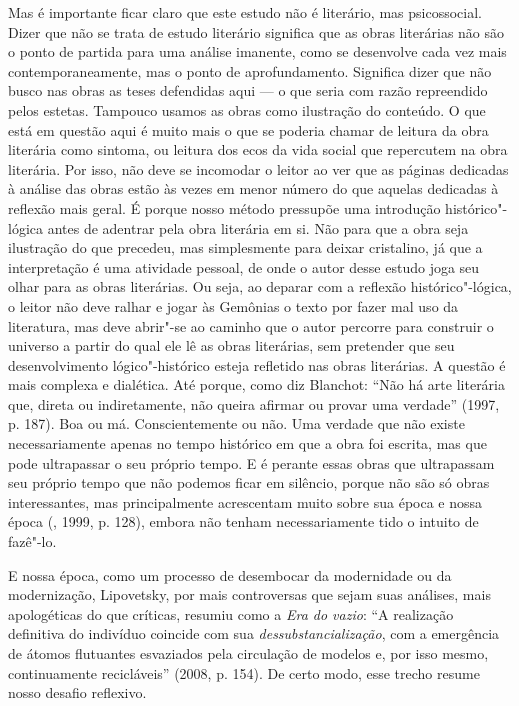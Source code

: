 Mas é importante ficar claro que este estudo não é literário, mas
psicossocial. Dizer que não se trata de estudo literário significa que
as obras literárias não são o ponto de partida para uma análise
imanente, como se desenvolve cada vez mais contemporaneamente, mas o
ponto de aprofundamento. Significa dizer que não busco nas obras as
teses defendidas aqui --- o que seria com razão repreendido pelos
estetas. Tampouco usamos as obras como ilustração do conteúdo. O que
está em questão aqui é muito mais o que se poderia chamar de leitura da
obra literária como sintoma, ou leitura dos ecos da vida social que
repercutem na obra literária. Por isso, não deve se incomodar o leitor
ao ver que as páginas dedicadas à análise das obras estão às vezes em
menor número do que aquelas dedicadas à reflexão mais geral. É porque
nosso método pressupõe uma introdução histórico"-lógica antes de adentrar
pela obra literária em si. Não para que a obra seja ilustração do que
precedeu, mas simplesmente para deixar cristalino, já que a
interpretação é uma atividade pessoal, de onde o autor desse estudo joga
seu olhar para as obras literárias. Ou seja, ao deparar com a reflexão
histórico"-lógica, o leitor não deve ralhar e jogar às Gemônias o texto
por fazer mal uso da literatura, mas deve abrir"-se ao caminho que o
autor percorre para construir o universo a partir do qual ele lê as
obras literárias, sem pretender que seu desenvolvimento lógico"-histórico
esteja refletido nas obras literárias. A questão é mais complexa e
dialética. Até porque, como diz Blanchot: ``Não há arte literária que,
direta ou indiretamente, não queira afirmar ou provar uma verdade''
(1997, p. 187). Boa ou má. Conscientemente ou não. Uma verdade que não
existe necessariamente apenas no tempo histórico em que a obra foi
escrita, mas que pode ultrapassar o seu próprio tempo. E é perante essas
obras que ultrapassam seu próprio tempo que não podemos ficar em
silêncio, porque não são só obras interessantes, mas principalmente
acrescentam muito sobre sua época e nossa época (, 1999, p. 128),
embora não tenham necessariamente tido o intuito de fazê"-lo.

E nossa época, como um processo de desembocar da modernidade ou da
modernização, Lipovetsky, por mais controversas que sejam suas análises,
mais apologéticas do que críticas, resumiu como a \emph{Era do
vazio}: ``A realização definitiva do indivíduo coincide com sua
\emph{dessubstancialização}, com a emergência de átomos flutuantes
esvaziados pela circulação de modelos e, por isso mesmo, continuamente
recicláveis'' (2008, p. 154). De certo modo, esse trecho resume nosso
desafio reflexivo.

